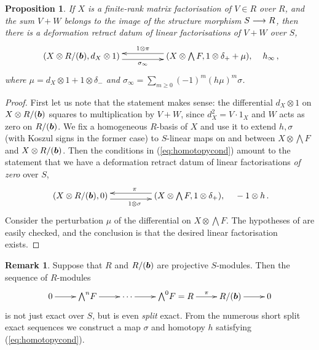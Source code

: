 \documentclass{compositio}
\newtheorem{proposition}[theorem]{Proposition}
\theoremstyle{definition}
\newtheorem{remark}[theorem]{Remark}
\numberwithin{equation}{section}
\begin{document}
\begin{proposition}\label{prop:pertapptechnical} If $X$ is a finite-rank matrix factorisation of $V \in R$ over $R$, and the sum $V + W$ belongs to the image of the structure morphism $S \longrightarrow R$, then there is a deformation retract datum of linear factorisations of $V+ W$ over $S$, 
\begin{equation}\label{eq:pre_perturb_htm3}
\xymatrix@C+2pc{
(X \otimes R/(\bb), d_X \otimes 1) \ar@<-0.8ex>[r]_-{\sigma_\infty} & (X \otimes \bigwedge F, 1 \otimes \delta_+ + \mu), \ar@<-0.8ex>[l]_-{1 \otimes \pi}
} \quad h_\infty\,,
\end{equation}
where $\mu = d_X \otimes 1 + 1 \otimes \delta_-$ and $\sigma_\infty = \sum_{m \ge 0} (-1)^m (h \mu)^m \sigma$.
\end{proposition}
\begin{proof}
First let us note that the statement makes sense: the differential $d_X \otimes 1$ on $X \otimes R/(\boldsymbol{b})$ squares to multiplication by $V + W$, since $d_X^2 = V \cdot 1_X$ and $W$ acts as zero on $R/(\boldsymbol{b})$. We fix a homogeneous $R$-basis of $X$ and use it to extend $h, \sigma$ (with Koszul signs in the former case) to $S$-linear maps on and between $X \otimes \bigwedge F$ and $X \otimes R/(\boldsymbol{b})$. Then the conditions in (\ref{eq:homotopycond}) amount to the statement that we have a deformation retract datum of linear factorisations \emph{of zero} over $S$, 
\[
\xymatrix@C+2pc{
(X \otimes R/(\bb), 0) \ar@<-0.8ex>[r]_{1 \otimes \sigma} & (X \otimes \bigwedge F, 1 \otimes \delta_+), \ar@<-0.8ex>[l]_{\pi}
} \quad - 1 \otimes h \, .
\]
Consider the perturbation $\mu$ of the differential on $X \otimes \bigwedge F$. The hypotheses of \cite[Proposition 6.1]{dm1102.2957} are easily checked, and the conclusion is that the desired linear factorisation exists.
\end{proof}

\begin{remark}\label{remark:splitexactsequenceskos}
Suppose that $R$ and $R/(\boldsymbol{b})$ are projective $S$-modules. Then the sequence of $R$-modules
\begin{equation}\label{eq:koszulexactseq}
\xymatrix{
0 \ar[r] & {\bigwedge}^n F \ar[r] & \cdots \ar[r] & {\bigwedge}^0 F = R \ar[r]^-{\pi} & R/(\bb) \ar[r] & 0
}
\end{equation}
is not just exact over $S$, but is even \emph{split} exact. From the numerous short split exact sequences we construct a map $\sigma$ and homotopy $h$ satisfying (\ref{eq:homotopycond}).
\end{remark}
\end{document}
